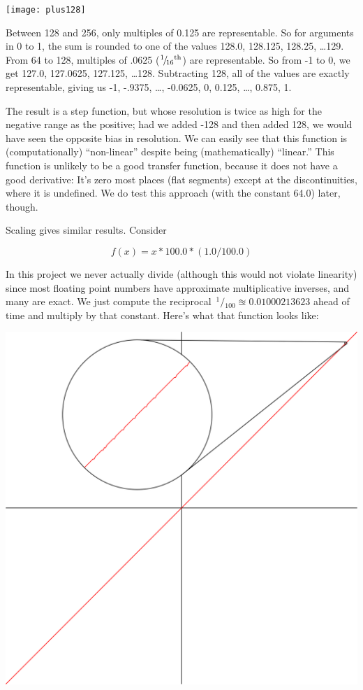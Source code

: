 \documentclass[twocolumn]{article}
\newcommand\sfrac[2]{\!{}\,^{#1}\!/{}\!_{#2}}
\begin{document}
\begin{center}
\texttt{[image: plus128]}
\end{center}


Between 128 and 256, only multiples of 0.125 are representable. So for
arguments in 0 to 1, the sum is rounded to one of the values 128.0,
128.125, 128.25, \ldots 129. From 64 to 128, multiples of .0625
($\sfrac{1}{16}\th$) are representable. So from -1 to 0, we get 127.0, 127.0625,
127.125, \ldots 128. Subtracting 128, all of the values are exactly
representable, giving us -1, -.9375, \ldots, -0.0625, 0, 0.125,
\ldots, 0.875, 1.

The result is a step function, but whose resolution is twice as high
for the negative range as the positive; had we added -128 and then
added 128, we would have seen the opposite bias in resolution. We can
easily see that this function is (computationally) ``non-linear''
despite being (mathematically) ``linear.'' This function is unlikely
to be a good transfer function, because it does not have a good
derivative: It's zero most places (flat segments) except at the
discontinuities, where it is undefined. We do test this approach
(with the constant 64.0) later, though.

Scaling gives similar results. Consider

$$f(x) = x * 100.0 * (1.0 / 100.0)$$

In this project we never actually divide (although this would not
violate linearity) since most floating point numbers have approximate
multiplicative inverses, and many are exact. We just compute the
reciprocal $\sfrac{1}{100} \approxeq 0.01000213623$ ahead of time and
multiply by that constant. Here's what that function looks like:

\begin{center}
\includegraphics[width=0.45 \linewidth]{times100zoom}
\end{center}
\end{document}
